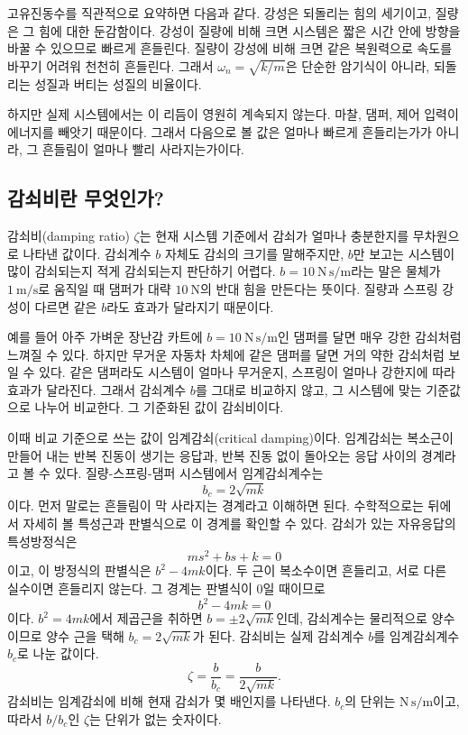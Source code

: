 고유진동수를 직관적으로 요약하면 다음과 같다.
강성은 되돌리는 힘의 세기이고, 질량은 그 힘에 대한 둔감함이다.
강성이 질량에 비해 크면 시스템은 짧은 시간 안에 방향을 바꿀 수 있으므로 빠르게 흔들린다.
질량이 강성에 비해 크면 같은 복원력으로 속도를 바꾸기 어려워 천천히 흔들린다.
그래서 $\omega_n=\sqrt{k/m}$은 단순한 암기식이 아니라, 되돌리는 성질과 버티는 성질의 비율이다.

하지만 실제 시스템에서는 이 리듬이 영원히 계속되지 않는다.
마찰, 댐퍼, 제어 입력이 에너지를 빼앗기 때문이다.
그래서 다음으로 볼 값은 얼마나 빠르게 흔들리는가가 아니라, 그 흔들림이 얼마나 빨리 사라지는가이다.

\subsection{감쇠비란 무엇인가?}

감쇠비(damping ratio) $\zeta$는 현재 시스템 기준에서 감쇠가 얼마나 충분한지를 무차원으로 나타낸 값이다.
감쇠계수 $b$ 자체도 감쇠의 크기를 말해주지만, $b$만 보고는 시스템이 많이 감쇠되는지 적게 감쇠되는지 판단하기 어렵다.
$b=10~\mathrm{N\,s/m}$라는 말은 물체가 $1~\mathrm{m/s}$로 움직일 때 댐퍼가 대략 $10~\mathrm{N}$의 반대 힘을 만든다는 뜻이다.
질량과 스프링 강성이 다르면 같은 $b$라도 효과가 달라지기 때문이다.

예를 들어 아주 가벼운 장난감 카트에 $b=10~\mathrm{N\,s/m}$인 댐퍼를 달면 매우 강한 감쇠처럼 느껴질 수 있다.
하지만 무거운 자동차 차체에 같은 댐퍼를 달면 거의 약한 감쇠처럼 보일 수 있다.
같은 댐퍼라도 시스템이 얼마나 무거운지, 스프링이 얼마나 강한지에 따라 효과가 달라진다.
그래서 감쇠계수 $b$를 그대로 비교하지 않고, 그 시스템에 맞는 기준값으로 나누어 비교한다.
그 기준화된 값이 감쇠비이다.

이때 비교 기준으로 쓰는 값이 임계감쇠(critical damping)이다.
임계감쇠는 복소근이 만들어 내는 반복 진동이 생기는 응답과, 반복 진동 없이 돌아오는 응답 사이의 경계라고 볼 수 있다.
질량-스프링-댐퍼 시스템에서 임계감쇠계수는
\begin{equation}
  b_c=2\sqrt{mk}
\end{equation}
이다.
먼저 말로는 흔들림이 막 사라지는 경계라고 이해하면 된다.
수학적으로는 뒤에서 자세히 볼 특성근과 판별식으로 이 경계를 확인할 수 있다.
감쇠가 있는 자유응답의 특성방정식은
\begin{equation}
  ms^2+bs+k=0
\end{equation}
이고, 이 방정식의 판별식은 $b^2-4mk$이다.
두 근이 복소수이면 흔들리고, 서로 다른 실수이면 흔들리지 않는다.
그 경계는 판별식이 0일 때이므로
\begin{equation}
  b^2-4mk=0
\end{equation}
이다.
$b^2=4mk$에서 제곱근을 취하면 $b=\pm2\sqrt{mk}$인데, 감쇠계수는 물리적으로 양수이므로 양수 근을 택해 $b_c=2\sqrt{mk}$가 된다.
%
감쇠비는 실제 감쇠계수 $b$를 임계감쇠계수 $b_c$로 나눈 값이다.
\begin{equation}
  \zeta=\frac{b}{b_c}
  =
  \frac{b}{2\sqrt{mk}}.
\end{equation}
감쇠비는 임계감쇠에 비해 현재 감쇠가 몇 배인지를 나타낸다.
$b_c$의 단위는 $\mathrm{N\,s/m}$이고, 따라서 $b/b_c$인 $\zeta$는 단위가 없는 숫자이다.

